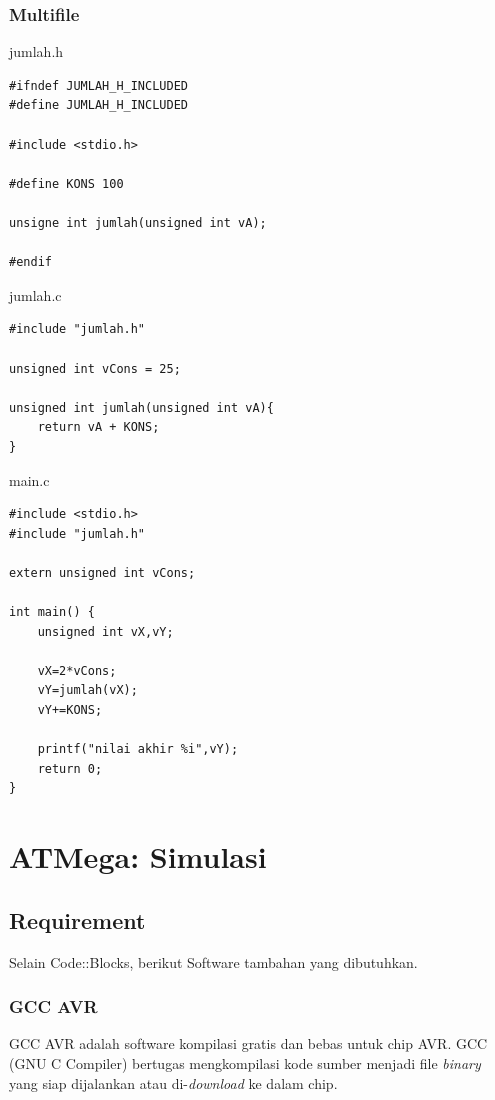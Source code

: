 \documentclass[12pt,]{article}
\begin{document}
	\subsubsection{Multifile}

	jumlah.h
	\begin{verbatim}
#ifndef JUMLAH_H_INCLUDED
#define JUMLAH_H_INCLUDED

#include <stdio.h>

#define KONS 100

unsigne int jumlah(unsigned int vA);

#endif
	\end{verbatim}

	jumlah.c
	\begin{verbatim}
#include "jumlah.h"

unsigned int vCons = 25;

unsigned int jumlah(unsigned int vA){
	return vA + KONS;
}
	\end{verbatim}

	\newpage
	main.c
	\begin{verbatim}
#include <stdio.h>
#include "jumlah.h"

extern unsigned int vCons;

int main() {
	unsigned int vX,vY;

	vX=2*vCons;
	vY=jumlah(vX);
	vY+=KONS;

	printf("nilai akhir %i",vY);
	return 0;
}

	\end{verbatim}

	\newpage
	\section{ATMega: Simulasi}

	\subsection{Requirement}

	Selain Code::Blocks, berikut Software tambahan yang dibutuhkan.

	\subsubsection{GCC AVR}
	GCC AVR adalah software kompilasi gratis dan bebas untuk chip AVR.
	GCC (GNU C Compiler) bertugas mengkompilasi kode sumber menjadi file \textit{binary} yang siap dijalankan atau di-\textit{download} ke dalam chip.
\end{document}
